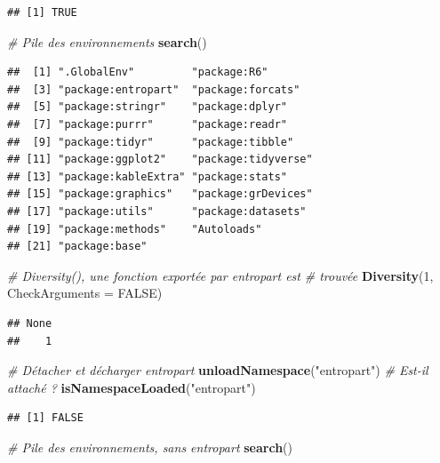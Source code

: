 \documentclass[
  12pt,
  french,
  a4paper,
  extrafontsizes,onecolumn,openright
  ]{memoir}
\newenvironment{Shaded}{\begin{snugshade}}{\end{snugshade}}
\newcommand{\CommentTok}[1]{\textcolor[rgb]{0.56,0.35,0.01}{\textit{#1}}}
\newcommand{\DataTypeTok}[1]{\textcolor[rgb]{0.13,0.29,0.53}{#1}}
\newcommand{\DecValTok}[1]{\textcolor[rgb]{0.00,0.00,0.81}{#1}}
\newcommand{\KeywordTok}[1]{\textcolor[rgb]{0.13,0.29,0.53}{\textbf{#1}}}
\newcommand{\NormalTok}[1]{#1}
\newcommand{\OtherTok}[1]{\textcolor[rgb]{0.56,0.35,0.01}{#1}}
\newcommand{\StringTok}[1]{\textcolor[rgb]{0.31,0.60,0.02}{#1}}
\begin{document}
\begin{verbatim}
## [1] TRUE
\end{verbatim}

\begin{Shaded}
\begin{Highlighting}[]
\CommentTok{# Pile des environnements}
\KeywordTok{search}\NormalTok{()}
\end{Highlighting}
\end{Shaded}

\begin{verbatim}
##  [1] ".GlobalEnv"         "package:R6"        
##  [3] "package:entropart"  "package:forcats"   
##  [5] "package:stringr"    "package:dplyr"     
##  [7] "package:purrr"      "package:readr"     
##  [9] "package:tidyr"      "package:tibble"    
## [11] "package:ggplot2"    "package:tidyverse" 
## [13] "package:kableExtra" "package:stats"     
## [15] "package:graphics"   "package:grDevices" 
## [17] "package:utils"      "package:datasets"  
## [19] "package:methods"    "Autoloads"         
## [21] "package:base"
\end{verbatim}

\begin{Shaded}
\begin{Highlighting}[]
\CommentTok{# Diversity(), une fonction exportée par entropart est}
\CommentTok{# trouvée}
\KeywordTok{Diversity}\NormalTok{(}\DecValTok{1}\NormalTok{, }\DataTypeTok{CheckArguments =} \OtherTok{FALSE}\NormalTok{)}
\end{Highlighting}
\end{Shaded}

\begin{verbatim}
## None 
##    1
\end{verbatim}

\begin{Shaded}
\begin{Highlighting}[]
\CommentTok{# Détacher et décharger entropart}
\KeywordTok{unloadNamespace}\NormalTok{(}\StringTok{"entropart"}\NormalTok{)}
\CommentTok{# Est-il attaché ?}
\KeywordTok{isNamespaceLoaded}\NormalTok{(}\StringTok{"entropart"}\NormalTok{)}
\end{Highlighting}
\end{Shaded}

\begin{verbatim}
## [1] FALSE
\end{verbatim}

\begin{Shaded}
\begin{Highlighting}[]
\CommentTok{# Pile des environnements, sans entropart}
\KeywordTok{search}\NormalTok{()}
\end{Highlighting}
\end{Shaded}
\end{document}
